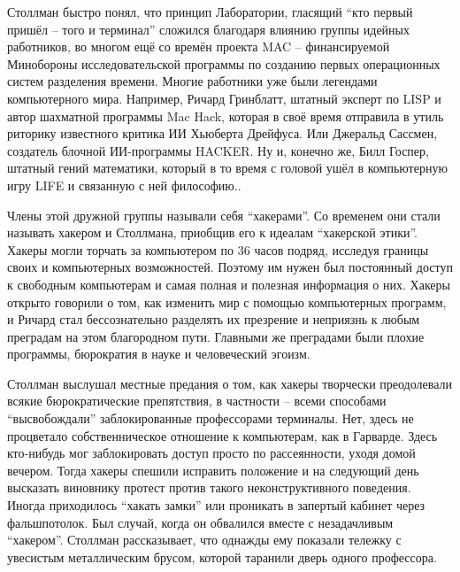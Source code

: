 Столлман быстро понял, что принцип Лаборатории, гласящий \enquote{кто первый пришёл -- того и терминал} сложился благодаря влиянию группы идейных работников, во многом ещё со времён проекта MAC -- финансируемой Минобороны исследовательской программы по созданию первых операционных систем разделения времени. Многие работники уже были легендами компьютерного мира. Например, Ричард Гринблатт, штатный эксперт по LISP и автор шахматной программы Mac Hack, которая в своё время отправила в утиль риторику известного критика ИИ Хьюберта Дрейфуса. Или Джеральд Сассмен, создатель блочной ИИ-программы HACKER. Ну и, конечно же, Билл Госпер, штатный гений математики, который в то время с головой ушёл в компьютерную игру LIFE и связанную с ней философию..

Члены этой дружной группы называли себя \enquote{хакерами}. Со временем они стали называть хакером и Столлмана, приобщив его к идеалам \enquote{хакерской этики}. Хакеры могли торчать за компьютером по 36 часов подряд, исследуя границы своих и компьютерных возможностей. Поэтому им нужен был постоянный доступ к свободным компьютерам и самая полная и полезная информация о них. Хакеры открыто говорили о том, как изменить мир с помощью компьютерных программ, и Ричард стал бессознательно разделять их презрение и неприязнь к любым преградам на этом благородном пути. Главными же преградами были плохие программы, бюрократия в науке и человеческий эгоизм.

Столлман выслушал местные предания о том, как хакеры творчески преодолевали всякие бюрократические препятствия, в частности -- всеми способами \enquote{высвобождали} заблокированные профессорами терминалы. Нет, здесь не процветало собственническое отношение к компьютерам, как в Гарварде. Здесь кто-нибудь мог заблокировать доступ просто по рассеянности, уходя домой вечером. Тогда хакеры спешили исправить положение и на следующий день высказать виновнику протест против такого неконструктивного поведения. Иногда приходилось \enquote{хакать замки} или проникать в запертый кабинет через фальшпотолок. Был случай, когда он обвалился вместе с незадачливым \enquote{хакером}. Столлман рассказывает, что однажды ему показали тележку с увесистым металлическим брусом, которой таранили дверь одного профессора.

